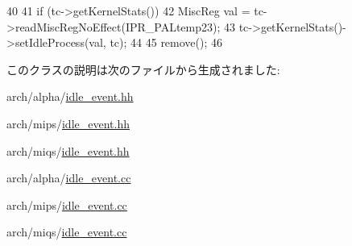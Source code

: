 \begin{DoxyCode}
40 {
41     if (tc->getKernelStats()) {
42         MiscReg val = tc->readMiscRegNoEffect(IPR_PALtemp23);
43         tc->getKernelStats()->setIdleProcess(val, tc);
44     }
45     remove();
46 }
\end{DoxyCode}


このクラスの説明は次のファイルから生成されました:\begin{DoxyCompactItemize}
\item 
arch/alpha/\hyperlink{alpha_2idle__event_8hh}{idle\_\-event.hh}\item 
arch/mips/\hyperlink{mips_2idle__event_8hh}{idle\_\-event.hh}\item 
arch/miqs/\hyperlink{miqs_2idle__event_8hh}{idle\_\-event.hh}\item 
arch/alpha/\hyperlink{alpha_2idle__event_8cc}{idle\_\-event.cc}\item 
arch/mips/\hyperlink{mips_2idle__event_8cc}{idle\_\-event.cc}\item 
arch/miqs/\hyperlink{miqs_2idle__event_8cc}{idle\_\-event.cc}\end{DoxyCompactItemize}
